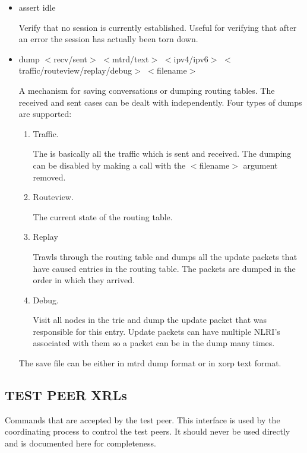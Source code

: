 \documentclass[11pt]{article}
\begin{document}
\begin{itemize}
\item {\sf assert idle}

  Verify that no session is currently established. Useful for
  verifying that after an error the session has actually been torn down.

\item {\sf dump $<$recv/sent$>$ $<$mtrd/text$>$ $<$ipv4/ipv6$>$ $<$traffic/routeview/replay/debug$>$ $<$filename$>$}

  A mechanism for saving conversations or dumping routing tables. The
  received and sent cases can be dealt with independently. Four types
  of dumps are supported:

  \begin{enumerate}

        \item Traffic.

        The is basically all the traffic which is sent and
        received. The dumping can be disabled by making a call with
        the $<$filename$>$ argument removed.

        \item Routeview.

        The current state of the routing table.

        \item Replay

        Trawls through the routing table and dumps all the update
        packets that have caused entries in the routing table. The
        packets are dumped in the order in which they arrived.

        \item Debug.

        Visit all nodes in the trie and dump the update packet that
        was responsible for this entry. Update packets can have
        multiple NLRI's associated with them so a packet can be in the
        dump many times.

      \end{enumerate}

  The save file can be either in mtrd dump format or in xorp text format.

\end{itemize}
\subsection{TEST PEER XRLs}
Commands that are accepted by the test peer. This interface is
used by the coordinating process to control the test peers. It should
never be used directly and is documented here for completeness.
\end{document}
